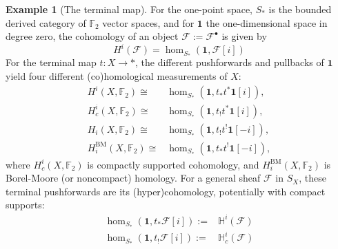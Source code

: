 \documentclass{amsart}
\theoremstyle{definition}
\newtheorem{ex}[thm]{Example}
\theoremstyle{remark}
\begin{document}
\begin{ex}[The terminal map]\label{Ex:terminal map}
For the one-point space, $S_{\ast}$ is the bounded derived category of $\mathbb{F}_2$ vector spaces, and for $\mathbf{1}$ the one-dimensional space in degree zero, the cohomology of an object $\mathcal{F}:=\mathcal{F}^\bullet$ is given by \[H^i(\mathcal{F})=\hom_{S_\ast}(\mathbf{1},\mathcal{F}[i])\]
For the terminal map $t:X\to \ast$, the different pushforwards and pullbacks of $\mathbf{1}$ yield four different (co)homological measurements of $X$:
\begin{align*}
H^i(X,\mathbb{F}_2)\cong& \hom_{S_\ast}(\mathbf{1},{t}_*t^*\mathbf{1}[i]), \\
H^i_c(X,\mathbb{F}_2)\cong& \hom_{S_\ast}(\mathbf{1},{t}_!t^*\mathbf{1}[i]), \\
H_i(X,\mathbb{F}_2)\cong& \hom_{S_\ast}(\mathbf{1},{t}_!t^!\mathbf{1}[-i]), \\
H^{\mathrm{BM}}_i(X,\mathbb{F}_2)\cong& \hom_{S_\ast}(\mathbf{1},{t}_*t^!\mathbf{1}[-i]),
\end{align*}
where $H^i_c(X,\mathbb{F}_2)$ is compactly supported cohomology, and $H^{\mathrm{BM}}_i(X,\mathbb{F}_2)$ is Borel-Moore (or noncompact) homology.
For a general sheaf $\mathcal{F}$ in $S_X$, these terminal pushforwards are its (hyper)cohomology, potentially with compact supports:
\begin{align*}
    \hom_{S_\ast}(\mathbf{1},t_*\mathcal{F}[i]):=&\mathbb{H}^i(\mathcal{F})\\
    \hom_{S_\ast}(\mathbf{1},t_!\mathcal{F}[i]):=&\mathbb{H}^i_c(\mathcal{F})
\end{align*}

\end{ex}
\end{document}
